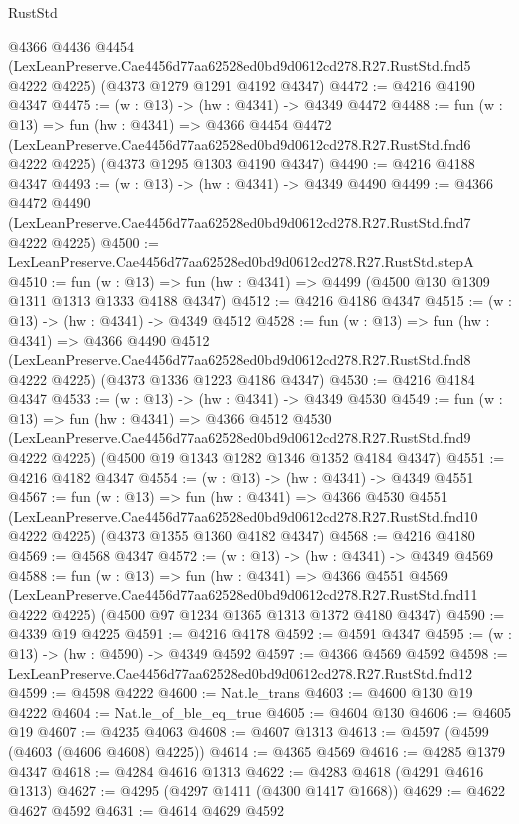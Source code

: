 \begin{lexlean}{RustStd}
\begin{coremodule}
  @4366
    @4436
    @4454
    (LexLeanPreserve.Cae4456d77aa62528ed0bd9d0612cd278.R27.RustStd.fnd5 @4222 @4225)
    (@4373 @1279 @1291 @4192 @4347)
@4472 := @4216 @4190 @4347
@4475 := (w : @13) -> (hw : @4341) -> @4349 @4472
@4488 := fun (w : @13) =>
  fun (hw : @4341) =>
  @4366
    @4454
    @4472
    (LexLeanPreserve.Cae4456d77aa62528ed0bd9d0612cd278.R27.RustStd.fnd6 @4222 @4225)
    (@4373 @1295 @1303 @4190 @4347)
@4490 := @4216 @4188 @4347
@4493 := (w : @13) -> (hw : @4341) -> @4349 @4490
@4499 := @4366
    @4472
    @4490
    (LexLeanPreserve.Cae4456d77aa62528ed0bd9d0612cd278.R27.RustStd.fnd7 @4222 @4225)
@4500 := LexLeanPreserve.Cae4456d77aa62528ed0bd9d0612cd278.R27.RustStd.stepA
@4510 := fun (w : @13) => fun (hw : @4341) => @4499 (@4500 @130 @1309 @1311 @1313 @1333 @4188 @4347)
@4512 := @4216 @4186 @4347
@4515 := (w : @13) -> (hw : @4341) -> @4349 @4512
@4528 := fun (w : @13) =>
  fun (hw : @4341) =>
  @4366
    @4490
    @4512
    (LexLeanPreserve.Cae4456d77aa62528ed0bd9d0612cd278.R27.RustStd.fnd8 @4222 @4225)
    (@4373 @1336 @1223 @4186 @4347)
@4530 := @4216 @4184 @4347
@4533 := (w : @13) -> (hw : @4341) -> @4349 @4530
@4549 := fun (w : @13) =>
  fun (hw : @4341) =>
  @4366
    @4512
    @4530
    (LexLeanPreserve.Cae4456d77aa62528ed0bd9d0612cd278.R27.RustStd.fnd9 @4222 @4225)
    (@4500 @19 @1343 @1282 @1346 @1352 @4184 @4347)
@4551 := @4216 @4182 @4347
@4554 := (w : @13) -> (hw : @4341) -> @4349 @4551
@4567 := fun (w : @13) =>
  fun (hw : @4341) =>
  @4366
    @4530
    @4551
    (LexLeanPreserve.Cae4456d77aa62528ed0bd9d0612cd278.R27.RustStd.fnd10 @4222 @4225)
    (@4373 @1355 @1360 @4182 @4347)
@4568 := @4216 @4180
@4569 := @4568 @4347
@4572 := (w : @13) -> (hw : @4341) -> @4349 @4569
@4588 := fun (w : @13) =>
  fun (hw : @4341) =>
  @4366
    @4551
    @4569
    (LexLeanPreserve.Cae4456d77aa62528ed0bd9d0612cd278.R27.RustStd.fnd11 @4222 @4225)
    (@4500 @97 @1234 @1365 @1313 @1372 @4180 @4347)
@4590 := @4339 @19 @4225
@4591 := @4216 @4178
@4592 := @4591 @4347
@4595 := (w : @13) -> (hw : @4590) -> @4349 @4592
@4597 := @4366 @4569 @4592
@4598 := LexLeanPreserve.Cae4456d77aa62528ed0bd9d0612cd278.R27.RustStd.fnd12
@4599 := @4598 @4222
@4600 := Nat.le_trans
@4603 := @4600 @130 @19 @4222
@4604 := Nat.le_of_ble_eq_true
@4605 := @4604 @130
@4606 := @4605 @19
@4607 := @4235 @4063
@4608 := @4607 @1313
@4613 := @4597 (@4599 (@4603 (@4606 @4608) @4225))
@4614 := @4365 @4569
@4616 := @4285 @1379 @4347
@4618 := @4284 @4616 @1313
@4622 := @4283 @4618 (@4291 @4616 @1313)
@4627 := @4295 (@4297 @1411 (@4300 @1417 @1668))
@4629 := @4622 @4627 @4592
@4631 := @4614 @4629 @4592

\end{coremodule}
\end{lexlean}
